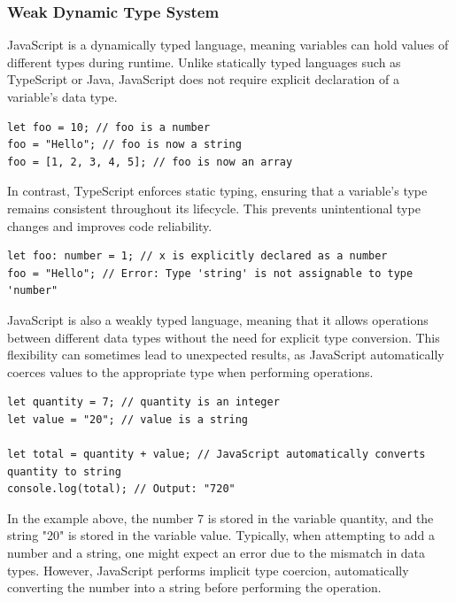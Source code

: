 \subsubsection{Weak Dynamic Type System}

JavaScript is a dynamically typed language, meaning variables can hold values of different types during runtime. Unlike statically typed languages such as TypeScript or Java, JavaScript does not require explicit declaration of a variable's data type.

\begin{lstlisting}[caption=Holding Values of different Types during Runtime]
let foo = 10; // foo is a number
foo = "Hello"; // foo is now a string
foo = [1, 2, 3, 4, 5]; // foo is now an array
\end{lstlisting}

In contrast, TypeScript enforces static typing, ensuring that a variable's type remains consistent throughout its lifecycle. This prevents unintentional type changes and improves code reliability.

\begin{lstlisting}[caption=Statically Typed Language TypeScript]
let foo: number = 1; // x is explicitly declared as a number
foo = "Hello"; // Error: Type 'string' is not assignable to type 'number"
\end{lstlisting}

JavaScript is also a weakly typed language, meaning that it allows operations between different data types without the need for explicit type conversion. This flexibility can sometimes lead to unexpected results, as JavaScript automatically coerces values to the appropriate type when performing operations.

\begin{lstlisting}[caption=Automatic type conversion in JavaScript]
let quantity = 7; // quantity is an integer
let value = "20"; // value is a string

let total = quantity + value; // JavaScript automatically converts quantity to string
console.log(total); // Output: "720"
\end{lstlisting}

In the example above, the number 7 is stored in the variable quantity, and the string "20" is stored in the variable value. Typically, when attempting to add a number and a string, one might expect an error due to the mismatch in data types. However, JavaScript performs implicit type coercion, automatically converting the number into a string before performing the operation.

